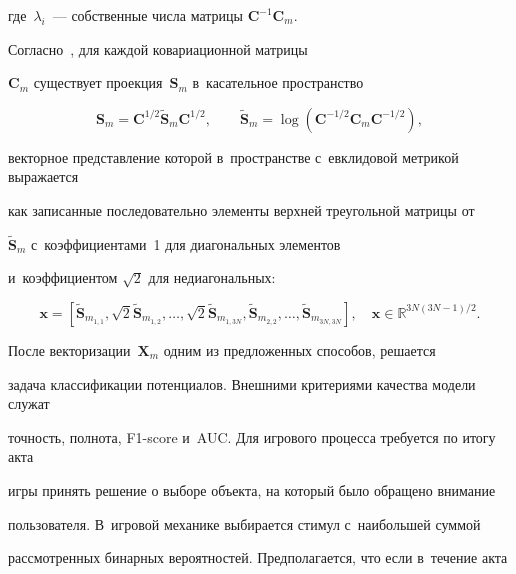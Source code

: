 где~$\lambda_{i}$~--- собственные числа  матрицы $\mathbf{C}^{-1} 

\mathbf{C}_{m}.$



Согласно~\cite{Plug_and_Play_P300_BCI}, для каждой ковариационной матрицы 

$\mathbf{C}_{m}$ существует проекция~$\mathbf{S}_{m}$ в~касательное пространство

$$

    \mathbf{S}_{m}=\mathbf{C}^{{1}/{2}} \tilde{\mathbf{S}}_m 

\mathbf{C}^{{1}/{2}}, \qquad

    \tilde{\mathbf{S}}_m = \log \left(\mathbf{C}^{-{1}/{2}} \mathbf{C}_{m} 

\mathbf{C}^{-{1}/{2}}\right),



$$

векторное представление которой в~пространстве с~евклидовой метрикой выражается 

как записанные последовательно элементы верхней треугольной матрицы от 

$\tilde{\mathbf{S}}_m$ с~коэффициентами~1 для диагональных элементов 

и~коэффициентом $\sqrt{2}$ для недиагональных:

$$

\mathbf{x} = \left[\tilde{\mathbf{S}}_{m_{1,1}}, \sqrt{2}\tilde{\mathbf{S}}_{m_{1,2}}, \dots  ,

\sqrt{2}\tilde{\mathbf{S}}_{m_{1,3N}}, \tilde{\mathbf{S}}_{m_{2,2}}, \dots ,

\tilde{\mathbf{S}}_{m_{3N,3N}}\right], \quad \mathbf{x} \in \mathbb{R}^{{3N(3N-1)}/{2}}.

$$

После векторизации~$\mathbf{X}_{m}$ одним из предложенных способов, решается 

задача классификации потенциалов. Внешними критериями качества модели служат 

точность, полнота, F1-score и~AUC. Для игрового процесса требуется по итогу акта 

игры принять решение о выборе объекта, на который было обращено внимание 

пользователя. В~игровой механике выбирается стимул с~наибольшей суммой 

рассмотренных бинарных вероятностей. Предполагается, что если в~течение акта 

